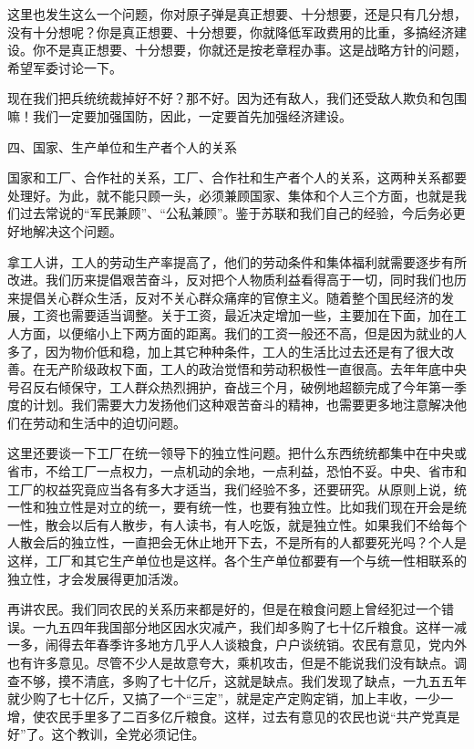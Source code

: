 \documentclass[UTF8, 12pt, a4paper]{ctexrep}
\begin{document}
这里也发生这么一个问题，你对原子弹是真正想要、十分想要，还是只有几分想，没有十分想呢？你是真正想要、十分想要，你就降低军政费用的比重，多搞经济建设。你不是真正想要、十分想要，你就还是按老章程办事。这是战略方针的问题，希望军委讨论一下。

现在我们把兵统统裁掉好不好？那不好。因为还有敌人，我们还受敌人欺负和包围嘛！我们一定要加强国防，因此，一定要首先加强经济建设。

四、国家、生产单位和生产者个人的关系

国家和工厂、合作社的关系，工厂、合作社和生产者个人的关系，这两种关系都要处理好。为此，就不能只顾一头，必须兼顾国家、集体和个人三个方面，也就是我们过去常说的“军民兼顾”、“公私兼顾”。鉴于苏联和我们自己的经验，今后务必更好地解决这个问题。

拿工人讲，工人的劳动生产率提高了，他们的劳动条件和集体福利就需要逐步有所改进。我们历来提倡艰苦奋斗，反对把个人物质利益看得高于一切，同时我们也历来提倡关心群众生活，反对不关心群众痛痒的官僚主义。随着整个国民经济的发展，工资也需要适当调整。关于工资，最近决定增加一些，主要加在下面，加在工人方面，以便缩小上下两方面的距离。我们的工资一般还不高，但是因为就业的人多了，因为物价低和稳，加上其它种种条件，工人的生活比过去还是有了很大改善。在无产阶级政权下面，工人的政治觉悟和劳动积极性一直很高。去年年底中央号召反右倾保守，工人群众热烈拥护，奋战三个月，破例地超额完成了今年第一季度的计划。我们需要大力发扬他们这种艰苦奋斗的精神，也需要更多地注意解决他们在劳动和生活中的迫切问题。

这里还要谈一下工厂在统一领导下的独立性问题。把什么东西统统都集中在中央或省市，不给工厂一点权力，一点机动的余地，一点利益，恐怕不妥。中央、省市和工厂的权益究竟应当各有多大才适当，我们经验不多，还要研究。从原则上说，统一性和独立性是对立的统一，要有统一性，也要有独立性。比如我们现在开会是统一性，散会以后有人散步，有人读书，有人吃饭，就是独立性。如果我们不给每个人散会后的独立性，一直把会无休止地开下去，不是所有的人都要死光吗？个人是这样，工厂和其它生产单位也是这样。各个生产单位都要有一个与统一性相联系的独立性，才会发展得更加活泼。

再讲农民。我们同农民的关系历来都是好的，但是在粮食问题上曾经犯过一个错误。一九五四年我国部分地区因水灾减产，我们却多购了七十亿斤粮食。这样一减一多，闹得去年春季许多地方几乎人人谈粮食，户户谈统销。农民有意见，党内外也有许多意见。尽管不少人是故意夸大，乘机攻击，但是不能说我们没有缺点。调查不够，摸不清底，多购了七十亿斤，这就是缺点。我们发现了缺点，一九五五年就少购了七十亿斤，又搞了一个“三定”，就是定产定购定销，加上丰收，一少一增，使农民手里多了二百多亿斤粮食。这样，过去有意见的农民也说“共产党真是好”了。这个教训，全党必须记住。
\end{document}
